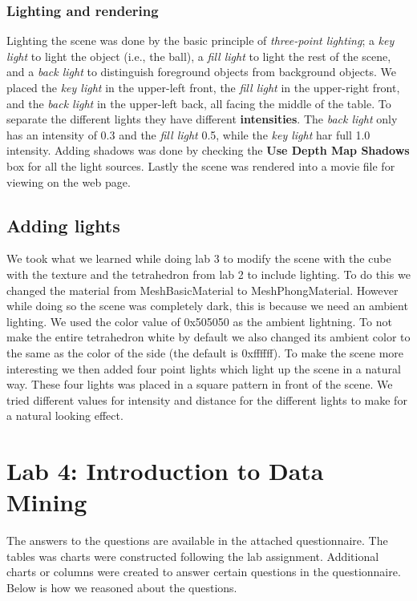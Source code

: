 \documentclass[a4paper]{article}
\begin{document}
\subsubsection{Lighting and rendering}
Lighting the scene was done by the basic principle of \textit{three-point
lighting}; a \textit{key light} to light the object (i.e., the ball), a
\textit{fill light} to light the rest of the scene, and a \textit{back light} to
distinguish foreground objects from background objects. We placed the
\textit{key light} in the upper-left front, the \textit{fill light} in the
upper-right front, and the \textit{back light} in the upper-left back, all
facing the middle of the table. To separate the different lights they have
different \textbf{intensities}. The \textit{back light} only has an intensity of
0.3 and the \textit{fill light} 0.5, while the \textit{key light} har full 1.0
intensity. Adding shadows was done by checking the \textbf{Use Depth Map
Shadows} box for all the light sources. Lastly the scene was rendered into a
movie file for viewing on the web page.

\subsection{Adding lights} %

We took what we learned while doing lab 3 to modify the scene with the cube with
the texture and the tetrahedron from lab 2 to include lighting. To do this we changed the
material from MeshBasicMaterial to MeshPhongMaterial. However while doing so the
scene was completely dark, this is because we need an ambient lighting. We used
the color value of 0x505050 as the ambient lightning. To not make the entire
tetrahedron white by default we also changed its ambient color to the same as
the color of the side (the default is 0xffffff). To make the scene more
interesting we then added four point lights which light up the scene in a
natural way. These four lights was placed in a square pattern in front of the
scene. We tried different values for intensity and distance for the different
lights to make for a natural looking effect.

\newpage
\section{Lab 4: Introduction to Data Mining}
The answers to the questions are available in the attached questionnaire. The
tables was charts were constructed following the lab assignment. Additional
charts or columns were created to answer certain questions in the questionnaire.
Below is how we reasoned about the questions.
\end{document}
